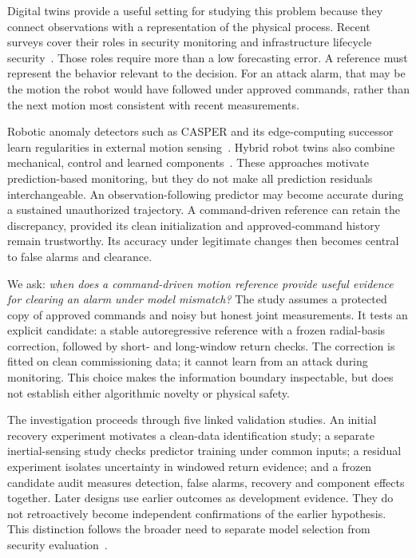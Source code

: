 \documentclass[11pt]{article}
\begin{document}
Digital twins provide a useful setting for studying this problem because they connect observations with a representation of the physical process. Recent surveys cover their roles in security monitoring and infrastructure lifecycle security~\cite{securitysurvey,lifecycle}. Those roles require more than a low forecasting error. A reference must represent the behavior relevant to the decision. For an attack alarm, that may be the motion the robot would have followed under approved commands, rather than the next motion most consistent with recent measurements.

Robotic anomaly detectors such as CASPER and its edge-computing successor learn regularities in external motion sensing~\cite{casper,edge}. Hybrid robot twins also combine mechanical, control and learned components~\cite{hybrid}. These approaches motivate prediction-based monitoring, but they do not make all prediction residuals interchangeable. An observation-following predictor may become accurate during a sustained unauthorized trajectory. A command-driven reference can retain the discrepancy, provided its clean initialization and approved-command history remain trustworthy. Its accuracy under legitimate changes then becomes central to false alarms and clearance.

We ask: \emph{when does a command-driven motion reference provide useful evidence for clearing an alarm under model mismatch?} The study assumes a protected copy of approved commands and noisy but honest joint measurements. It tests an explicit candidate: a stable autoregressive reference with a frozen radial-basis correction, followed by short- and long-window return checks. The correction is fitted on clean commissioning data; it cannot learn from an attack during monitoring. This choice makes the information boundary inspectable, but does not establish either algorithmic novelty or physical safety.

The investigation proceeds through five linked validation studies. An initial recovery experiment motivates a clean-data identification study; a separate inertial-sensing study checks predictor training under common inputs; a residual experiment isolates uncertainty in windowed return evidence; and a frozen candidate audit measures detection, false alarms, recovery and component effects together. Later designs use earlier outcomes as development evidence. They do not retroactively become independent confirmations of the earlier hypothesis. This distinction follows the broader need to separate model selection from security evaluation~\cite{arp}.
\end{document}
